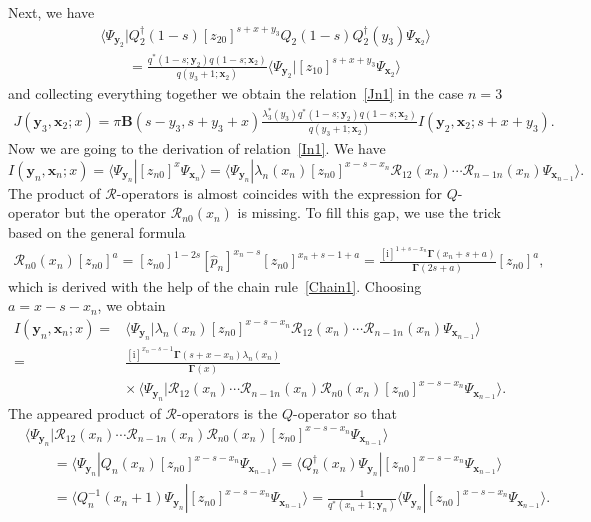 \documentclass[10pt,a4paper]{amsart}
\renewcommand{\imath}{\mathrm{i}}
\numberwithin{equation}{section}
\begin{document}
Next, we have
\begin{align*}
&
\bigl\langle \Psi_{\bm{y}_2}|
Q^{\dagger}_2(1-s)
[z_{20}]^{s+x+y_3}
Q_2(1-s) Q^{\dagger}_2(y_3)
\Psi_{\bm{x}_2}\bigr\rangle \\
& \qquad =
\frac{q^*(1-s;\bm{y}_2) q(1-s;\bm{x}_2)}
{q(y_3+1;\bm{x}_2)}
\langle \Psi_{\bm{y}_2}|[z_{10}]^{s+x+y_3}
\Psi_{\bm{x}_2}\rangle
\end{align*}
and collecting everything together we obtain the relation~\eqref{Jn1}
in the case $n=3$
\begin{align*}
J(\bm{y}_3,\bm{x}_{2};x) =
\pi \mathbf{B}(s-y_3,s+y_3+x)
\frac{\lambda_3^\ast(y_3) q^{*}(1-s;\bm{y}_{2}) q(1-s;\bm{x}_{2})}
{q(y_{3}+1;\bm{x}_{2})}
 I(\bm{y}_{2},\bm{x}_{2};s+x+y_{3}).
\end{align*}
Now we are going to the derivation of relation~\eqref{In1}. We have
\begin{equation*}
I(\bm{y}_n,\bm{x}_{n};x) =
\langle\Psi_{\bm{y}_n}| [z_{n0}]^{x} \Psi_{\bm{x}_{n}}\rangle =
\langle\Psi_{\bm{y}_n}|
\lambda_n(x_n) [z_{n0}]^{x-s-x_n} \mathcal{R}_{12}(x_n)\cdots\mathcal{R}_{n-1 n}(x_n)
\Psi_{\bm{x}_{n-1}}\rangle .
\end{equation*}
The product of $\mathcal{R}$-operators is almost coincides with the
expression for $Q$-operator but the operator $\mathcal{R}_{n0}(x_n)$ is missing.
To fill this gap, we use the trick based on the general formula
\begin{align}\label{Rn0}
\mathcal{R}_{n0}(x_n) [z_{n0}]^{a} =
[z_{n0}]^{1-2s} [\hat{p}_n]^{x_n-s} [z_{n0}]^{x_n+s-1+a} =
\frac{[\imath]^{1+s-x_n} \mathbf{\Gamma}(x_n+s+a)}
{\mathbf{\Gamma}(2s+a)}
[z_{n0}]^{a} ,
\end{align}
which is derived with the help of the chain rule~\eqref{Chain1}.
Choosing $a = x-s-x_n$, we obtain
\begin{align*}
I(\bm{y}_n,\bm{x}_{n};x) ={}& \langle\Psi_{\bm{y}_n}| \lambda_n(x_n)
[z_{n0}]^{x-s-x_n} \mathcal{R}_{12}(x_n)\cdots\mathcal{R}_{n-1 n}(x_n)
\Psi_{\bm{x}_{n-1}}\rangle \\
={}&
\frac{[\imath]^{x_n-s-1} \mathbf{\Gamma}(s+x-x_n) \lambda_n(x_n)}
{\mathbf{\Gamma}(x)} \\
& {\times}\, \langle\Psi_{\bm{y}_n}|
\mathcal{R}_{12}(x_n)\cdots\mathcal{R}_{n-1 n}(x_n)
\mathcal{R}_{n0}(x_n) [z_{n0}]^{x-s-x_n} \Psi_{\bm{x}_{n-1}}\rangle .
\end{align*}
The appeared product of $\mathcal{R}$-operators is the $Q$-operator so that
\begin{align*}
&
\langle\Psi_{\bm{y}_n}|
\mathcal{R}_{12}(x_n)\cdots\mathcal{R}_{n-1 n}(x_n)
\mathcal{R}_{n0}(x_n) [z_{n0}]^{x-s-x_n} \Psi_{\bm{x}_{n-1}}\rangle \\
& \qquad =
\langle\Psi_{\bm{y}_n}| Q_n(x_n) [z_{n0}]^{x-s-x_n} \Psi_{\bm{x}_{n-1}}\rangle =
\bigl\langle Q^{\dagger}_n(x_n)\Psi_{\bm{y}_n}|
 [z_{n0}]^{x-s-x_n} \Psi_{\bm{x}_{n-1}}\bigr\rangle \\
& \qquad =
\langle Q^{-1}_n(x_n+1)\Psi_{\bm{y}_n}|
 [z_{n0}]^{x-s-x_n} \Psi_{\bm{x}_{n-1}}\rangle =
\frac{1}{q^*(x_n+1;\bm{y}_n)} \langle \Psi_{\bm{y}_n}|
 [z_{n0}]^{x-s-x_n} \Psi_{\bm{x}_{n-1}}\rangle .
\end{align*}
\end{document}
